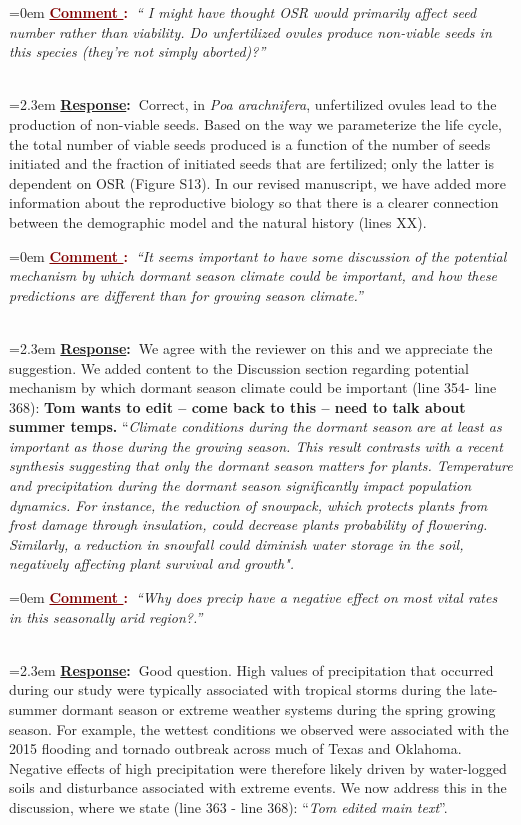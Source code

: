 \documentclass[12pt]{article}
\newcounter{cN}
\newcommand{\comment}[1]{
	\vspace{2em}
	\refstepcounter{cN} %
	\noindent \hangindent=0em \textbf{\textcolor{Maroon}{\uline{Comment \thecN}:~}}\emph{``#1''}
	}
\newcommand{\response}[1]{
	\\[0.25em]
	\hangindent=2.3em \textbf{\textcolor{NavyBlue}{\uline{Response}:~}}#1
	}
\begin{document}
\comment{ I might have thought OSR would primarily affect seed number rather than viability. Do unfertilized ovules produce non-viable seeds in this species (they’re not simply aborted)?}
\response{Correct, in \emph{Poa arachnifera}, unfertilized ovules lead to the production of non-viable seeds. 
Based on the way we parameterize the life cycle, the total number of viable seeds produced is a function of the number of seeds initiated and the fraction of initiated seeds that are fertilized; only the latter is dependent on OSR (Figure S13). 
In our revised manuscript, we have added more information about the reproductive biology so that there is a clearer connection between the demographic model and the natural history (lines XX). }

\comment{It seems important to have some discussion of the potential mechanism by which dormant season climate could be important, and how these predictions are different than for growing season climate.}
\response{We agree with the reviewer on this and we appreciate the suggestion.  
We added content to the Discussion section regarding potential mechanism by which dormant season climate could be important (line  354- line 368):
\textbf{Tom wants to edit -- come back to this -- need to talk about summer temps.}
“\emph{Climate conditions during the dormant season are at least as important as those during the growing season. 
This result contrasts with a recent synthesis suggesting that only the dormant season matters for plants. 
Temperature and precipitation during the dormant season significantly impact population dynamics. 
For instance, the reduction of snowpack, which protects plants from frost damage through insulation, could decrease plants probability of flowering. 
Similarly, a reduction in snowfall could diminish water storage in the soil, negatively affecting plant survival and growth".}}

\comment{Why does precip have a negative effect on most vital rates in this seasonally arid region?.}
\response{Good question. High values of precipitation that occurred during our study were typically associated with tropical storms during the late-summer dormant season or extreme weather systems during the spring growing season. 
For example, the wettest conditions we observed were associated with the 2015 flooding and tornado outbreak across much of Texas and Oklahoma. 
Negative effects of high precipitation were therefore likely driven by water-logged soils and disturbance associated with extreme events. 
We now address this in the discussion, where we state (line 363 - line 368): “\emph{Tom edited main text}”.
}
\end{document}
